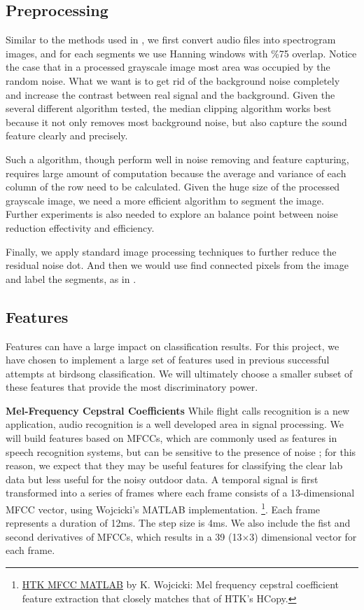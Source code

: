 \documentclass{article} %
\begin{document}
\subsection{Preprocessing}

Similar to the methods used in \cite{Lasseck13}, we first convert audio files into spectrogram images, and for each segments we use Hanning windows with \%75 overlap. Notice the case that in a processed grayscale image most area was occupied by the random noise. What we want is to get rid of the background noise completely and increase the contrast between real signal and the background. Given the several different algorithm tested, the median clipping algorithm \cite{mlsp1} works best because it not only removes most background noise, but also capture the sound feature clearly and precisely. 

Such a algorithm, though perform well in noise removing and feature capturing, requires large amount of computation because the average and variance of each column of the row need to be calculated. Given the huge size of the processed grayscale image, we need a more efficient algorithm to segment the image. Further experiments is also needed to explore an balance point between noise reduction effectivity and efficiency.

Finally, we apply standard image processing techniques to further reduce the residual noise dot. And then we would use find connected pixels from the image and label the segments, as in \cite{Lasseck13}.

\subsection{Features}
\label{sec:Features}

Features can have a large impact on classification results. For this project, we have chosen to implement a large set of features used in previous successful attempts at birdsong classification. We will ultimately choose a smaller subset of these features that provide the most discriminatory power. 


\textbf{Mel-Frequency Cepstral Coefficients}
While flight calls recognition is a new application, audio recognition is a well developed area in signal processing. We will build features based on MFCCs, which are commonly used as features in speech recognition systems, but can be sensitive to the presence of noise \cite{tyagi2005desensitizing}; for this reason, we expect that they may be
useful features for classifying the clear lab data but less useful for the noisy outdoor data. A temporal signal is first transformed into a series of frames where each frame consists of a 13-dimensional MFCC vector, using Wojcicki's MATLAB
implementation. \footnote{\scriptsize \href{http://www.mathworks.com/matlabcentral/fileexchange/32849-htk-mfcc-matlab/content/mfcc/mfcc.m}{HTK MFCC MATLAB} by K. Wojcicki: Mel frequency cepstral coefficient feature extraction that closely matches that of HTK's HCopy.}. Each frame represents a duration of 12ms. The step size is 4ms. We also include the fist and second derivatives of MFCCs, which results in a 39 (13$\times$3) dimensional vector for each frame.
\end{document}
